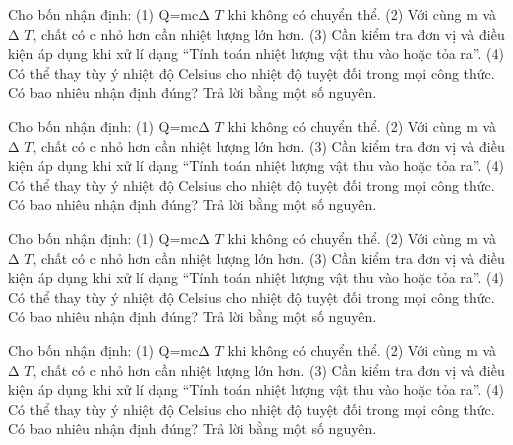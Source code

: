 \begin{ex}
Cho bốn nhận định: (1) Q=mcΔ $T$ khi không có chuyển thể. (2) Với cùng m và Δ $T$, chất có c nhỏ hơn cần nhiệt lượng lớn hơn. (3) Cần kiểm tra đơn vị và điều kiện áp dụng khi xử lí dạng “Tính toán nhiệt lượng vật thu vào hoặc tỏa ra”. (4) Có thể thay tùy ý nhiệt độ Celsius cho nhiệt độ tuyệt đối trong mọi công thức. Có bao nhiêu nhận định đúng? Trả lời bằng một số nguyên.
\end{ex}

\begin{ex}
Cho bốn nhận định: (1) Q=mcΔ $T$ khi không có chuyển thể. (2) Với cùng m và Δ $T$, chất có c nhỏ hơn cần nhiệt lượng lớn hơn. (3) Cần kiểm tra đơn vị và điều kiện áp dụng khi xử lí dạng “Tính toán nhiệt lượng vật thu vào hoặc tỏa ra”. (4) Có thể thay tùy ý nhiệt độ Celsius cho nhiệt độ tuyệt đối trong mọi công thức. Có bao nhiêu nhận định đúng? Trả lời bằng một số nguyên.
\end{ex}

\begin{ex}
Cho bốn nhận định: (1) Q=mcΔ $T$ khi không có chuyển thể. (2) Với cùng m và Δ $T$, chất có c nhỏ hơn cần nhiệt lượng lớn hơn. (3) Cần kiểm tra đơn vị và điều kiện áp dụng khi xử lí dạng “Tính toán nhiệt lượng vật thu vào hoặc tỏa ra”. (4) Có thể thay tùy ý nhiệt độ Celsius cho nhiệt độ tuyệt đối trong mọi công thức. Có bao nhiêu nhận định đúng? Trả lời bằng một số nguyên.
\end{ex}

\begin{ex}
Cho bốn nhận định: (1) Q=mcΔ $T$ khi không có chuyển thể. (2) Với cùng m và Δ $T$, chất có c nhỏ hơn cần nhiệt lượng lớn hơn. (3) Cần kiểm tra đơn vị và điều kiện áp dụng khi xử lí dạng “Tính toán nhiệt lượng vật thu vào hoặc tỏa ra”. (4) Có thể thay tùy ý nhiệt độ Celsius cho nhiệt độ tuyệt đối trong mọi công thức. Có bao nhiêu nhận định đúng? Trả lời bằng một số nguyên.
\end{ex}

